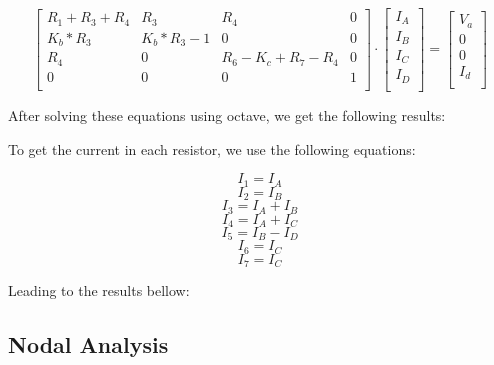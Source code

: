 \vspace{0.5cm}

\[
\begin{bmatrix}
R_1 + R_3 + R_4 & R_3 & R_4 & 0\\
K_b * R_3 & K_b * R_3 - 1 & 0 & 0\\
R_4 & 0 & R_6 - K_c + R_7 - R_4 & 0\\
0 & 0 & 0 & 1\\
\end{bmatrix}
\cdot
\begin{bmatrix}
I_A\\
I_B\\
I_C\\
I_D\\
\end{bmatrix}
=
\begin{bmatrix}
V_a\\
0\\
0\\
I_d\\
\end{bmatrix}
\]

\vspace{0.5cm}

After solving these equations using octave, we get 
the following results:

\vspace{0.5cm}


To get the current in each resistor, we use the following equations:

\vspace{0.5cm}

$$ I_1 = I_A $$
$$ I_2 = I_B $$
$$ I_3 = I_A + I_B $$
$$ I_4 = I_A + I_C $$
$$ I_5 = I_B - I_D $$
$$ I_6 = I_C $$
$$ I_7 = I_C $$

\vspace{0.5cm}

Leading to the results bellow:

\vspace{0.5cm}


\vspace{1.0cm}

\subsection{Nodal Analysis}

\vspace{0.5cm}


